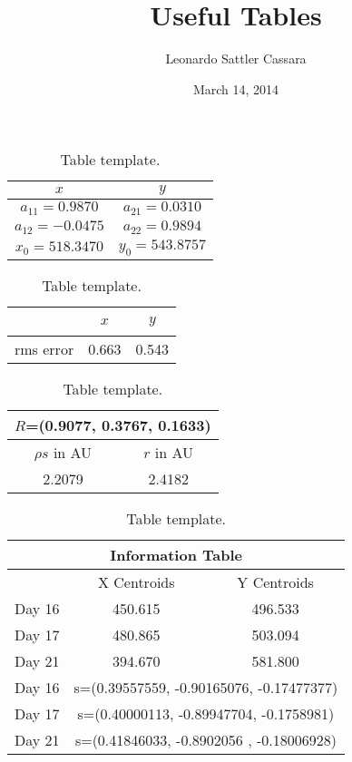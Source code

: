 \documentclass{article}
\begin{document}
\title{Useful Tables}
\author{Leonardo Sattler Cassara}
\date{March 14, 2014}
\maketitle



\begin{table}[H]
\center
\begin{tabular}{|c|c|}
\hline
$x$    &   $y$    \\ 
\hline
$a_{11}=0.9870$ & $a_{21}=0.0310$ \\ 
$a_{12}=-0.0475$ & $a_{22}=0.9894$ \\ 
$x_{0}=518.3470$ & $y_{0}=543.8757$ \\ 
\hline
\end{tabular}
\caption{Table template.} 
\label{tab:1}
\end{table}



\begin{table}[H]
\center
\begin{tabular}{|c|c|c|}
\hline
~  &   $x$  & $y$ \\ 
\hline
rms error  &   0.663 & 0.543 \\ 
\hline
\end{tabular}
\caption{Table template.} 
\label{tab:2}
\end{table}



\begin{table}[H]
\center
\begin{tabular}{|c|c|}
\hline
\multicolumn{2}{|c|}{$R$=(0.9077, 0.3767, 0.1633)}\\
\hline
$\rho s$ in AU    &   $r$ in AU   \\ 
\hline
2.2079 & 2.4182 \\ 
\hline
\end{tabular}
\caption{Table template.} 
\label{tab:1}
\end{table}



\begin{table}[H]
\center
\begin{tabular}{|c|c|c|}
\hline
\multicolumn{3}{|c|}{Information Table}\\
\hline
  ~    & X Centroids & Y Centroids \\ 
\hline
Day 16 & 450.615 & 496.533\\ 
Day 17 & 480.865 & 503.094\\ 
Day 21 & 394.670 & 581.800\\ 
\hline
Day 16   &  \multicolumn{2}{|c|}{s=(0.39557559, -0.90165076, -0.17477377)}\\
\hline
Day 17   &  \multicolumn{2}{|c|}{s=(0.40000113, -0.89947704, -0.1758981)}\\
\hline
Day 21   &  \multicolumn{2}{|c|}{s=(0.41846033, -0.8902056 , -0.18006928)}\\
\hline
\end{tabular}
\caption{Table template.} 
\label{tab:1}
\end{table}
\end{document}
